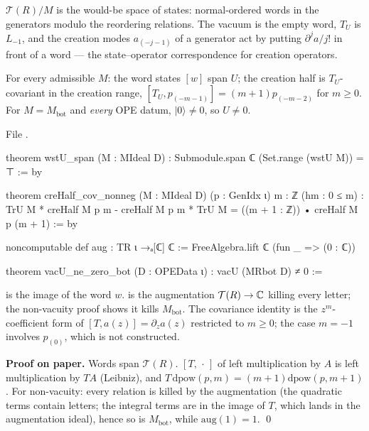 \begin{physics}
$\mathcal T(R)/M$ is the would-be space of states: normal-ordered words in the generators modulo the reordering relations. The
vacuum is the empty word, $T_U$ is $L_{-1}$, and the creation modes $a_{(-j-1)}$ of a generator act by putting $\partial^ja/j!$ in front of a
word --- the state--operator correspondence for creation operators.
\end{physics}


\begin{theorem}\label{l11:thm:URbasic}
For every admissible $M$: the word states $[w]$ span $U$; the creation half is $T_U$-covariant in the creation range,
$[T_U,p_{(-m-1)}] = (m+1)p_{(-m-2)}$ for $m\ge0$. For $M = M_{\mathrm{bot}}$ and \emph{every} OPE datum, $|0\rangle\neq0$, so $U\neq0$.
\end{theorem}
\noindent File .
\begin{leancode}
theorem wstU_span (M : MIdeal D) : Submodule.span ℂ (Set.range (wstU M)) = ⊤ := by

theorem creHalf_cov_nonneg (M : MIdeal D) (p : GenIdx ι) {m : ℤ} (hm : 0 ≤ m) :
    TrU M * creHalf M p m - creHalf M p m * TrU M = ((m + 1 : ℤ)) • creHalf M p (m + 1) := by

noncomputable def aug : TR ι →ₐ[ℂ] ℂ := FreeAlgebra.lift ℂ (fun _ => (0 : ℂ))

theorem vacU_ne_zero_bot (D : OPEData ι) : vacU (MRbot D) ≠ 0 :=
\end{leancode}

\begin{dictionary}
 is the image of the word $w$.  is the augmentation $\mathcal T(R)\to{\mathbb{C}}$ killing every letter; the
non-vacuity proof shows it kills $M_{\mathrm{bot}}$. The covariance identity is the $z^m$-coefficient form of $[T,a(z)] =
\partial_za(z)$ restricted to $m\ge0$; the case $m=-1$ involves $p_{(0)}$, which is not constructed.
\end{dictionary}

\textbf{Proof on paper.} Words span $\mathcal T(R)$. $[T,\,\cdot\,]$ of left multiplication by $A$ is left multiplication by $TA$
(Leibniz), and $T\,\mathrm{dpow}(p,m) = (m+1)\mathrm{dpow}(p,m+1)$. For non-vacuity: every relation is killed by the augmentation
(the quadratic terms contain letters; the integral terms are in the image of $T$, which lands in the augmentation ideal),
hence so is $M_{\mathrm{bot}}$, while $\mathrm{aug}(1) = 1$. \qed

